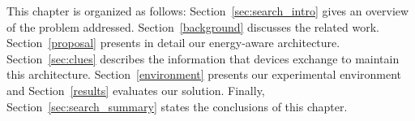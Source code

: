 This chapter is organized as follows:
Section~\ref{sec:search_intro} gives an overview of the problem addressed.
Section~\ref{background} discusses the related work.
Section~\ref{proposal} presents in detail our energy-aware architecture.
Section~\ref{sec:clues} describes the information that devices exchange to maintain this architecture.
Section~\ref{environment} presents our experimental environment and Section~\ref{results} evaluates our solution.
Finally, Section~\ref{sec:search_summary} states the conclusions of this chapter.












